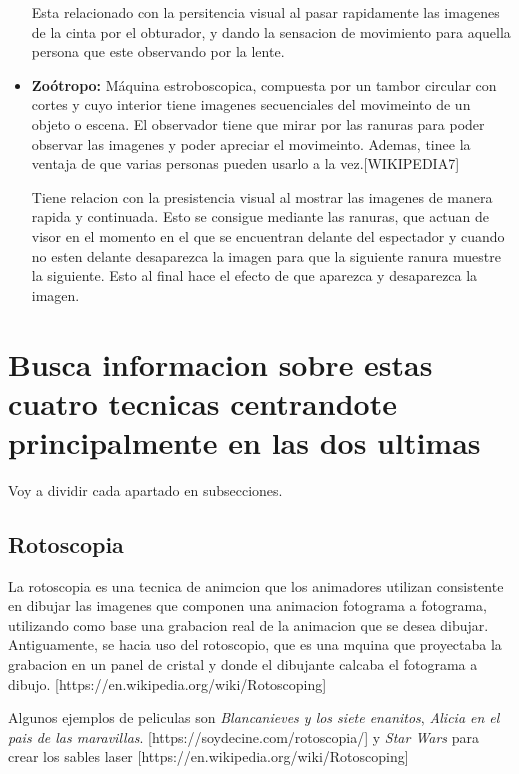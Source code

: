 \documentclass{article}
\begin{document}
\begin{itemize}
    Esta relacionado con la persitencia visual al pasar rapidamente las imagenes de la cinta por el obturador, y dando la sensacion de movimiento para aquella persona que este observando por la lente.

    \item \textbf{Zoótropo: }Máquina estroboscopica, compuesta por un tambor circular con cortes y cuyo interior tiene imagenes secuenciales del movimeinto de un objeto o escena. El observador tiene que mirar por las ranuras para poder observar las imagenes y poder apreciar el movimeinto. Ademas, tinee la ventaja de que varias personas pueden usarlo a la vez.[WIKIPEDIA7]
    
    Tiene relacion con la presistencia visual al mostrar las imagenes de manera rapida y continuada. Esto se consigue mediante las ranuras, que actuan de visor en el momento en el que se encuentran delante del espectador y cuando no esten delante desaparezca la imagen para que la siguiente ranura muestre la siguiente. Esto al final hace el efecto de que aparezca y desaparezca la imagen.
\end{itemize}


\section{Busca informacion sobre estas cuatro tecnicas centrandote principalmente en las dos ultimas}

Voy a dividir cada apartado en subsecciones.

\subsection{Rotoscopia}

La rotoscopia es una tecnica de animcion que los animadores utilizan consistente en dibujar las imagenes que componen una animacion fotograma a fotograma, utilizando como base una grabacion real de la animacion que se desea dibujar. Antiguamente, se hacia uso del rotoscopio, que es una mquina que proyectaba la grabacion en un panel de cristal y donde el dibujante calcaba el fotograma a dibujo. [https://en.wikipedia.org/wiki/Rotoscoping]

\bigskip

Algunos ejemplos de peliculas son \textit{Blancanieves y los siete enanitos}, \textit{Alicia en el pais de las maravillas}. [https://soydecine.com/rotoscopia/] y \textit{Star Wars} para crear los sables laser [https://en.wikipedia.org/wiki/Rotoscoping]
\end{document}
